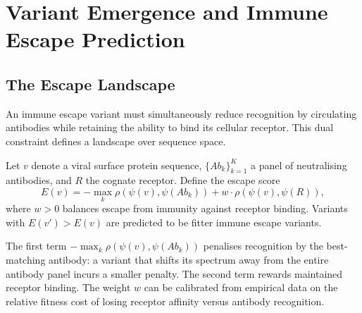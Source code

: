 \section{Variant Emergence and Immune Escape Prediction}
\label{ps:sec:escape}

\subsection{The Escape Landscape}

An immune escape variant must simultaneously reduce recognition by circulating
antibodies while retaining the ability to bind its cellular receptor. This dual
constraint defines a landscape over sequence space.

\begin{definition}
\label{ps:def:escape}
Let $v$ denote a viral surface protein sequence, $\{Ab_k\}_{k=1}^K$ a panel of
neutralising antibodies, and $R$ the cognate receptor. Define the escape score
\begin{equation}
  E(v) = -\max_k \rho\!\left(\psi(v), \psi(Ab_k)\right)
         + w \cdot \rho\!\left(\psi(v), \psi(R)\right),
  \label{ps:eq:escape_landscape}
\end{equation}
where $w > 0$ balances escape from immunity against receptor binding. Variants
with $E(v') > E(v)$ are predicted to be fitter immune escape variants.
\end{definition}

The first term $-\max_k \rho(\psi(v), \psi(Ab_k))$ penalises recognition by
the best-matching antibody: a variant that shifts its spectrum away from the
entire antibody panel incurs a smaller penalty. The second term rewards
maintained receptor binding. The weight $w$ can be calibrated from empirical
data on the relative fitness cost of losing receptor affinity versus antibody
recognition.

